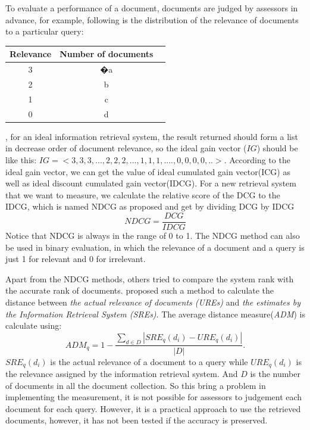 To evaluate a performance of a document, documents are judged by assessors in advance, for example, following is the distribution of the relevance of documents to a particular query:
\begin{center}
\begin{tabular}{  | c | c  | r | }
\hline
{}
 {Relevance}&  {Number of documents}
 \\
\hline
3  &�a\\
\hline
2 & b\\
\hline
1 & c\\
\hline
0 & d\\
\hline
\end{tabular}
\end{center}
, for an ideal information retrieval system, the result returned should form a list in decrease order of document relevance, so the ideal gain vector ($IG$) should be like this: $IG=<3,3,3,...,2,2,2,...,1,1,1,....,0,0,0,0,..>$. According to the ideal gain vector, we can get the value of ideal cumulated gain vector(ICG) as well as ideal discount cumulated gain vector(IDCG). For a new retrieval system that we want to measure, we calculate the relative score of the DCG to the IDCG, which is named NDCG as proposed and get by dividing DCG by IDCG 
\begin{equation}
NDCG=\frac{DCG}{IDCG}
\end{equation}
Notice that NDCG is always in the range of 0 to 1. The NDCG method can also be used in binary evaluation, in which the relevance of a document and a query is just 1 for relevant and 0 for irrelevant.

Apart from the NDCG methods, others tried to compare the system rank with the accurate rank of documents. \cite{Mizzaro2001} proposed such a method to calculate the distance between \textit{the actual relevance of documents (UREs)} and \textit{the estimates by the Information Retrieval System (SREs)}. The average distance measure(\textit{ADM}) is calculate using:
\begin{equation}
ADM_q=1-\frac{\sum\nolimits_{d\in{D}}|SRE_q(d_i)-URE_q(d_i)|}{|D|}.
\end{equation}
$SRE_q(d_i)$ is the actual relevance of a document to a query while $URE_q(d_i)$ is the relevance assigned by the information retrieval system. And $D$ is the number of documents in all the document collection. So this bring a problem in implementing the measurement, it is not possible for assessors to judgement each document for each query. However, it is a practical approach to use the retrieved documents, however, it has not been tested if the accuracy is preserved.

